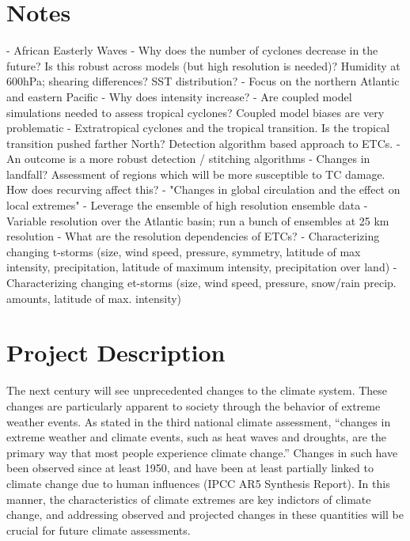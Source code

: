\documentclass[11pt]{article}
\begin{document}
\appendix

\addtocounter{section}{3}

\section*{Notes}

- African Easterly Waves
- Why does the number of cyclones decrease in the future?  Is this robust across models (but high resolution is needed)?  Humidity at 600hPa; shearing differences?  SST distribution?
- Focus on the northern Atlantic and eastern Pacific
- Why does intensity increase?
- Are coupled model simulations needed to assess tropical cyclones?  Coupled model biases are very problematic
- Extratropical cyclones and the tropical transition.  Is the tropical transition pushed farther North?  Detection algorithm based approach to ETCs.
- An outcome is a more robust detection / stitching algorithms
- Changes in landfall?  Assessment of regions which will be more susceptible to TC damage.  How does recurving affect this?
- "Changes in global circulation and the effect on local extremes"
- Leverage the ensemble of high resolution ensemble data
- Variable resolution over the Atlantic basin; run a bunch of ensembles at 25 km resolution
- What are the resolution dependencies of ETCs?
- Characterizing changing t-storms (size, wind speed, pressure, symmetry, latitude of max intensity, precipitation, latitude of maximum intensity, precipitation over land)
- Characterizing changing et-storms (size, wind speed, pressure, snow/rain precip. amounts, latitude of max. intensity)
 
\section{Project Description}

The next century will see unprecedented changes to the climate system.  These changes are particularly apparent to society through the behavior of extreme weather events. As stated in the third national climate assessment, ``changes in extreme weather and climate events, such as heat waves and droughts, are the primary way that most people experience climate change.''  Changes in such have been observed since at least 1950, and have been at least partially linked to climate change due to human influences (IPCC AR5 Synthesis Report).  In this manner, the characteristics of climate extremes are key indictors of climate change, and addressing observed and projected changes in these quantities will be crucial for future climate assessments.
\end{document}
